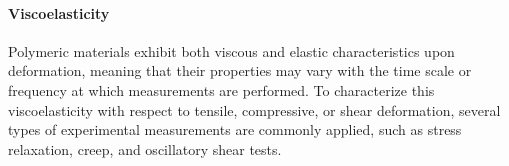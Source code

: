 \paragraph{Viscoelasticity} Polymeric materials exhibit both viscous and elastic characteristics upon deformation, meaning that their properties may vary with the time scale or frequency at which measurements are performed. 
To characterize this viscoelasticity with respect to tensile, compressive, or shear deformation, several types of experimental measurements are commonly applied, such as stress relaxation, creep, and oscillatory shear tests\citep{guPolymerNetworksPlastics2020}. 

\newpage
